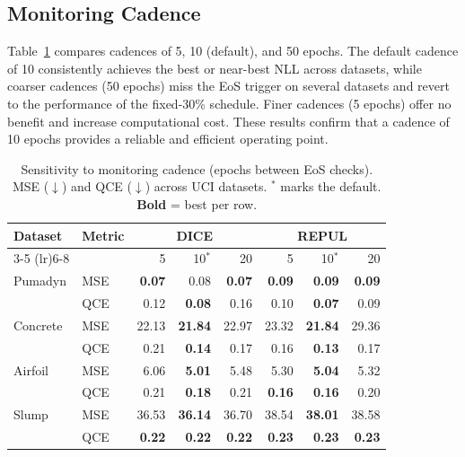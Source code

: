 \documentclass[sigconf]{acmart}
\begin{document}
\subsection{Monitoring Cadence}
\label{app:cadence}
Table~\ref{tab:sensitivity_cadence} compares cadences of 5, 10 (default), and 50 epochs. The default cadence of 10 consistently achieves the best or near-best NLL across datasets, while coarser cadences (50 epochs) miss the EoS trigger on several datasets and revert to the performance of the fixed-30\% schedule. Finer cadences (5 epochs) offer no benefit and increase computational cost. These results confirm that a cadence of 10 epochs provides a reliable and efficient operating point.

\begin{table}[!ht]
\centering
\caption{Sensitivity to monitoring cadence (epochs between EoS checks). MSE ($\downarrow$) and QCE ($\downarrow$) across UCI datasets. $^*$ marks the default. \textbf{Bold} = best per row.}
\label{tab:sensitivity_cadence}
\scriptsize
\setlength{\tabcolsep}{3pt}
\begin{tabular}{llrrrrrr}
\toprule
Dataset & Metric & \multicolumn{3}{c}{DICE} & \multicolumn{3}{c}{REPUL} \\
\cmidrule(lr){3-5} \cmidrule(lr){6-8}
& & 5 & 10$^*$ & 20 & 5 & 10$^*$ & 20 \\
\midrule
Pumadyn 
& MSE & \textbf{0.07} & 0.08 & \textbf{0.07} & \textbf{0.09} & \textbf{0.09} & \textbf{0.09} \\
& QCE & 0.12 & \textbf{0.08} & 0.16 & 0.10 & \textbf{0.07} & 0.09 \\
\midrule
Concrete 
& MSE & 22.13 & \textbf{21.84} & 22.97 & 23.32 & \textbf{21.84} & 29.36 \\
& QCE & 0.21 & \textbf{0.14} & 0.17 & 0.16 & \textbf{0.13} & 0.17 \\
\midrule
Airfoil 
& MSE & 6.06 & \textbf{5.01} & 5.48 & 5.30 & \textbf{5.04} & 5.32 \\
& QCE & 0.21 & \textbf{0.18} & 0.21 & \textbf{0.16} & \textbf{0.16} & 0.20 \\
\midrule
Slump 
& MSE & 36.53 & \textbf{36.14} & 36.70 & 38.54 & \textbf{38.01} & 38.58 \\
& QCE & \textbf{0.22} & \textbf{0.22} & \textbf{0.22} & \textbf{0.23} & \textbf{0.23} & \textbf{0.23} \\
\bottomrule
\end{tabular}
\end{table}
\end{document}
